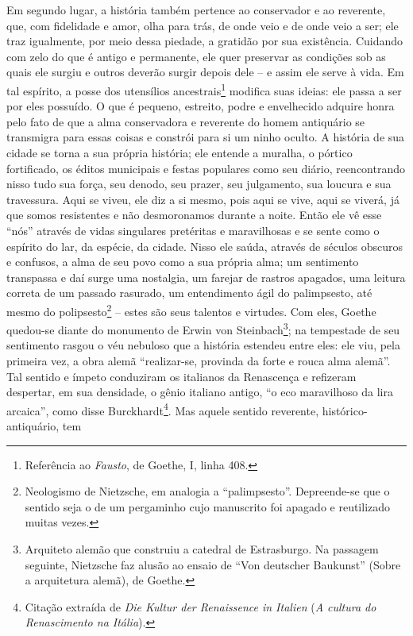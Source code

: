 Em segundo lugar, a história também pertence ao conservador e ao
reverente, que, com fidelidade e amor, olha para trás, de onde veio e de
onde veio a ser; ele traz igualmente, por meio dessa piedade, a gratidão
por sua existência. Cuidando com zelo do que é antigo e permanente, ele
quer preservar as condições sob as quais ele surgiu e outros deverão
surgir depois dele -- e assim ele serve à vida. Em tal espírito, a posse
dos utensílios ancestrais\footnote{Referência ao \emph{Fausto}, de
  Goethe, I, linha 408.} modifica suas ideias: ele passa a ser por eles
possuído. O que é pequeno, estreito, podre e envelhecido adquire honra
pelo fato de que a alma conservadora e reverente do homem antiquário se
transmigra para essas coisas e constrói para si um ninho oculto. A
história de sua cidade se torna a sua própria história; ele entende a
muralha, o pórtico fortificado, os éditos municipais e festas populares
como seu diário, reencontrando nisso tudo sua força, seu denodo, seu
prazer, seu julgamento, sua loucura e sua travessura. Aqui se viveu, ele
diz a si mesmo, pois aqui se vive, aqui se viverá, já que somos
resistentes e não desmoronamos durante a noite. Então ele vê esse
``nós'' através de vidas singulares pretéritas e maravilhosas e se sente
como o espírito do lar, da espécie, da cidade. Nisso ele saúda, através
de séculos obscuros e confusos, a alma de seu povo como a sua própria
alma; um sentimento transpassa e daí surge uma nostalgia, um farejar de
rastros apagados, uma leitura correta de um passado rasurado, um
entendimento ágil do palimpsesto, até mesmo do polipsesto\footnote{Neologismo
  de Nietzsche, em analogia a ``palimpsesto''. Depreende-se que o
  sentido seja o de um pergaminho cujo manuscrito foi apagado e
  reutilizado muitas vezes.} -- estes são seus talentos e virtudes. Com
eles, Goethe quedou-se diante do monumento de Erwin von
Steinbach\footnote{Arquiteto alemão que construiu a catedral de
  Estrasburgo. Na passagem seguinte, Nietzsche faz alusão ao ensaio de
  ``Von deutscher Baukunst'' (Sobre a arquitetura alemã), de Goethe.};
na tempestade de seu sentimento rasgou o véu nebuloso que a história
estendeu entre eles: ele viu, pela primeira vez, a obra alemã
``realizar-se, provinda da forte e rouca alma alemã''. Tal sentido e
ímpeto conduziram os italianos da Renascença e refizeram despertar, em
sua densidade, o gênio italiano antigo, ``o eco maravilhoso da lira
arcaica'', como disse Burckhardt\footnote{Citação extraída de \emph{Die
  Kultur der Renaissence in Italien} (\emph{A cultura do Renascimento na
  Itália}).}. Mas aquele sentido reverente, histórico-antiquário, tem
